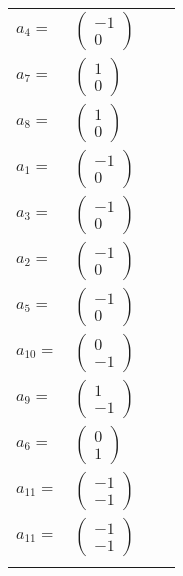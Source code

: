 \documentclass[1p]{elsarticle_modified}
\theoremstyle{definition}
\begin{document}
\begin{tabular}{m{7pt} m{180pt} m{7pt} m{180pt} }
\flushright $a_{4}=$&$\begin{pmatrix}-1\\0\end{pmatrix}$ \\
\flushright $a_{7}=$&$\begin{pmatrix}1\\0\end{pmatrix}$ \\
\flushright $a_{8}=$&$\begin{pmatrix}1\\0\end{pmatrix}$ \\
\flushright $a_{1}=$&$\begin{pmatrix}-1\\0\end{pmatrix}$ \\
\flushright $a_{3}=$&$\begin{pmatrix}-1\\0\end{pmatrix}$ \\
\flushright $a_{2}=$&$\begin{pmatrix}-1\\0\end{pmatrix}$ \\
\flushright $a_{5}=$&$\begin{pmatrix}-1\\0\end{pmatrix}$ \\
\flushright $a_{10}=$&$\begin{pmatrix}0\\-1\end{pmatrix}$ \\
\flushright $a_{9}=$&$\begin{pmatrix}1\\-1\end{pmatrix}$ \\
\flushright $a_{6}=$&$\begin{pmatrix}0\\1\end{pmatrix}$ \\
\flushright $a_{11}=$&$\begin{pmatrix}-1\\-1\end{pmatrix}$\\ \flushright $a_{11}=$&$\begin{pmatrix}-1\\-1\end{pmatrix}$\\&\end{tabular}
\end{document}
